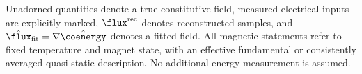 Unadorned quantities denote a true constitutive field, measured electrical
inputs are explicitly marked, $\flux^{\rm rec}$ denotes reconstructed samples,
and $\hat\flux_{\rm fit}=\nabla\hat\coenergy$ denotes a fitted field. All magnetic
statements refer to fixed temperature and magnet state, with an effective
fundamental or consistently averaged quasi-static description. No additional
energy measurement is assumed.

